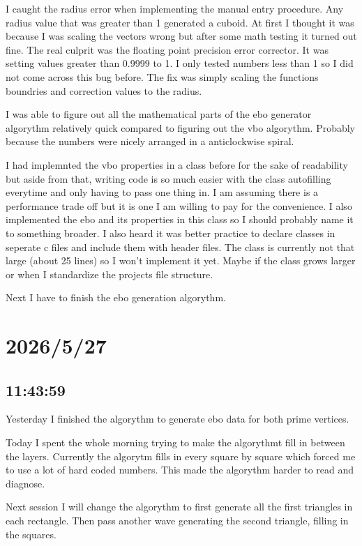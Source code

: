 \documentclass{article}
\begin{document}
I caught the radius error when implementing the manual entry procedure. Any radius value that was
greater than 1 generated a cuboid. At first I thought it was because I was scaling the vectors wrong
but after some math testing it turned out fine. The real culprit was the floating point precision 
error corrector. It was setting values greater than 0.9999 to 1. I only tested numbers less than 1
so I did not come across this bug before. The fix was simply scaling the functions boundries and 
correction values to the radius.

I was able to figure out all the mathematical parts of the ebo generator algorythm relatively quick 
compared to figuring out the vbo algorythm. Probably because the numbers were nicely arranged in a
anticlockwise spiral.

I had implemnted the vbo properties in a class before for the sake of readability but aside from that,
writing code is so much easier with the class autofilling everytime and only having to pass one thing in.
I am assuming there is a performance trade off but it is one I am willing to pay for the convenience. I
also implemented the ebo and its properties in this class so I should probably name it to something broader.
I also heard it was better practice to declare classes in seperate c files and include them with header files.
The class is currently not that large (about 25 lines) so I won't implement it yet. Maybe if the class
grows larger or when I standardize the projects file structure.

Next I have to finish the ebo generation algorythm.

\section*{2026/5/27}
\subsection*{11:43:59}
Yesterday I finished the algorythm to generate ebo data for both prime vertices.

Today I spent the whole morning trying to make the algorythmt fill in between the layers. Currently
the algorytm fills in every square by square which forced me to use a lot of hard coded numbers. 
This made the algorythm harder to read and diagnose.

Next session I will change the algorythm to first generate all the first triangles in each rectangle.
Then pass another wave generating the second triangle, filling in the squares.
\end{document}
